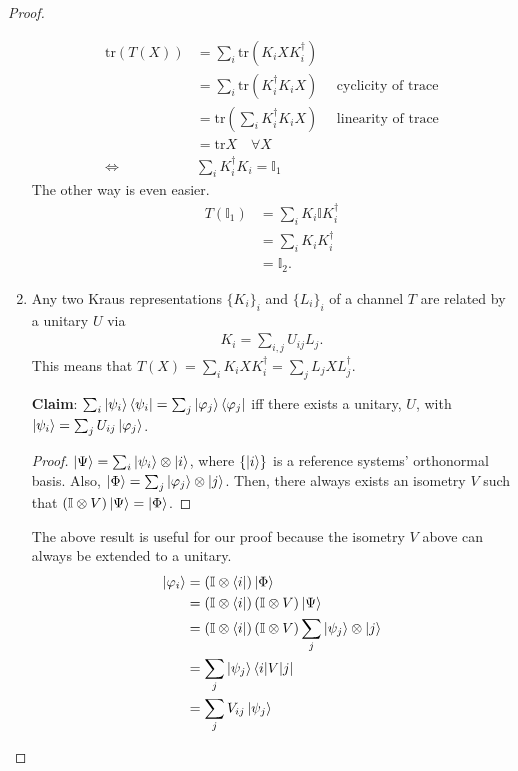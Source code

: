 \documentclass[../../note.tex]{subfiles}
\begin{document}
\begin{tcolorbox}[colframe=black,breakable, colback=black!5, arc=0pt, outer arc=0pt,boxrule=0.5pt]
\begin{proof}
\begin{enumerate}
    \begin{align}
        \text{tr}(T(X)) &= \sum_i \text{tr} \left(K_i X K_i^{\dagger}\right) \\
        &= \sum_i \text{tr} \left(K_i^{\dagger} K_i X\right) \quad \text{ cyclicity of trace}\\
        &= \text{tr}\left(\sum_i K_i^{\dagger} K_i X\right) \quad \text{ linearity of trace}\\
        &=\text{tr}X \quad \forall X\\
        \Leftrightarrow & \sum_i K_i^{\dagger}K_i = \mathbb{I}_1
    \end{align}
    The other way is even easier. 
    \begin{align}
        T(\mathbb{I}_1) &= \sum_i K_i \mathbb{I} K_i^{\dagger} \\
        &= \sum_i K_i K_i^{\dagger} \\
        &= \mathbb{I}_2.
    \end{align}
    
    \item Any two Kraus representations $\{K_i\}_i$ and $\{L_i\}_i$ of a channel $T$ are related by a unitary $U$ via 
    \begin{align}
        K_i = \sum_{i,j} U_{ij}L_j.
    \end{align}
    This means that $T(X)=\sum_i K_i X K_i^{\dagger} = \sum_j L_j X L_j^{\dagger}$.
    
    \textbf{Claim}: $\sum_i \ket{\psi_i}\bra{\psi_i} = \sum_j \ket{\varphi_j} \bra{\varphi_j}$ iff there exists a unitary, $U$, with $\ket{\psi_i} = \sum_j U_{ij} \ket{\varphi_j}$.
    
    \begin{proof}
    $\ket{\Psi}=\sum_i \ket{\psi_i} \otimes \ket{i}$, where $\{\ket{i}\}$ is a reference systems' orthonormal basis. Also, $\ket{\Phi}=\sum_j \ket{\varphi_j} \otimes \ket{j}$. Then, there always exists an isometry $V$ such that $(\mathbb{I}\otimes V) \ket{\Psi} = \ket{\Phi}$.
    \end{proof}
    The above result is useful for our proof because the isometry $V$ above can always be extended to a unitary.
    \begin{align}
        \ket{\varphi_i}&= \left(\mathbb{I} \otimes \bra{i}\right)\ket{\Phi} \\
        &= \left(\mathbb{I}\otimes \bra{i}\right)(\mathbb{I}\otimes V)\ket{\Psi} \\
        &= \left(\mathbb{I}\otimes \bra{i}\right)(\mathbb{I}\otimes V)\sum_j \ket{\psi_j} \otimes \ket{j}\\
        &= \sum_j \ket{\psi_j} \bra{i|V|j}\\
        &= \sum_j V_{ij} \ket{\psi_j}
    \end{align}
\end{enumerate}
\end{proof}
\end{tcolorbox}
\end{document}
